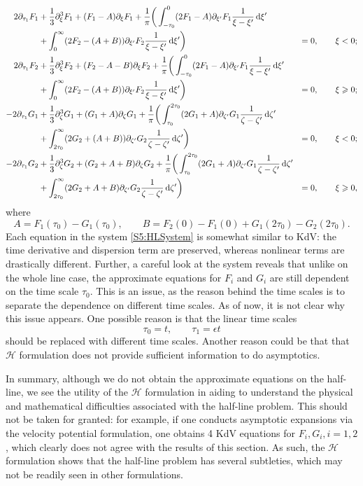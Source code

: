 \begin{equation}\label{S5:HLSystem}
\begin{aligned}
2 \partial_{\tau_1}F_1 &+ \frac{1}{3} \partial_\xi^3 F_1 + (F_1-A)\partial_\xi F_1 + \frac{1}{\pi} \bigg(\int^0_{-\tau_0} (2 F_1  - A)\partial_{\xi'} F_1\frac{1}{\xi -\xi'} \,\mathrm{d} \xi' \\
&+ \int^{\infty}_{0} (2 F_2 - (A+B))\partial_{\xi'} F_2 \frac{1}{\xi -\xi'} \,\mathrm{d} \xi'\bigg)  &= 0, \qquad \xi < 0; \\
2 \partial_{\tau_1}F_2 &+ \frac{1}{3} \partial_\xi^3 F_2 + (F_2-A-B)\partial_\xi F_2 + \frac{1}{\pi}  \bigg( \int^0_{-\tau_0} (2 F_1 -A)\partial_{\xi'}F_1\frac{1}{\xi -\xi'} \,\mathrm{d} \xi' \\
&+ \int^{\infty}_{0} (2 F_2 -  (A+B))\partial_{\xi'} F_2 \frac{1}{\xi -\xi'} \,\mathrm{d} \xi'  \bigg) &= 0, \qquad \xi \geqslant 0; \\
- 2 \partial_{\tau_1} G_1 &+  \frac{1}{3} \partial_\zeta^3 G_1 + (G_1+A) \partial_{\zeta} G_1 +  \frac{1}{\pi} \bigg( \int^{2\tau_0}_{\tau_0} (2 G_1 + A) \partial_{\zeta'} G_1 \frac{1}{\zeta -\zeta'} \,\mathrm{d} \zeta' \\
&+ \int^{\infty}_{2\tau_0} (2 G_2+(A+B)) \partial_{\zeta'} G_2 \frac{1}{\zeta -\zeta'} \,\mathrm{d} \zeta' \bigg) &= 0, \qquad \xi < 0; \\
- 2 \partial_{\tau_1} G_2 &+  \frac{1}{3} \partial_\zeta^3 G_2 + (G_2+ A +B)\partial_{\zeta} G_2 + \frac{1}{\pi}  \bigg( \int^{2\tau_0}_{\tau_0} (2 G_1 +A)\partial_{\zeta'} G_1 \frac{1}{\zeta -\zeta'} \,\mathrm{d} \zeta' \\
&+ \int^{\infty}_{2\tau_0} (2 G_2+A+B) \partial_{\zeta'} G_2 \frac{1}{\zeta -\zeta'} \,\mathrm{d} \zeta' \bigg) &= 0, \qquad \xi \geqslant 0,
\end{aligned}
\end{equation}
where 
\[ A = F_1(\tau_0)  - G_1(\tau_0), \qquad B = F_2(0) - F_1(0)  +  G_1(2\tau_0) - G_2(2\tau_0). \]
Each equation in the system \eqref{S5:HLSystem} is somewhat similar to KdV: the time derivative and dispersion term are preserved, whereas nonlinear terms are drastically different. Further, a careful look at the system reveals that unlike on the whole line case, the approximate equations for $F_i$ and $G_i$ are still dependent on the time scale $\tau_0.$ This is an issue, as the reason behind the time scales is to separate the dependence on different time scales. As of now, it is not clear why this issue appears. One possible reason is that the linear time scales
\[ \tau_0 = t, \qquad \tau_1 = \epsilon t\]
should be replaced with different time scales. Another reason could be that that $\mathcal{H}$ formulation does not provide sufficient information to do asymptotics.   

In summary, although we do not obtain the approximate equations on the half-line, we see the utility of the $\mathcal{H}$ formulation in aiding to understand the physical and mathematical difficulties associated with the half-line problem. This should not be taken for granted: for example, if one conducts asymptotic expansions via the velocity potential formulation, one obtains 4 KdV equations for $F_i, G_i, i =1, 2$, which clearly does not agree with the results of this section. As such, the $\mathcal{H}$ formulation shows that the half-line problem has several subtleties, which may not be readily seen in other formulations. 